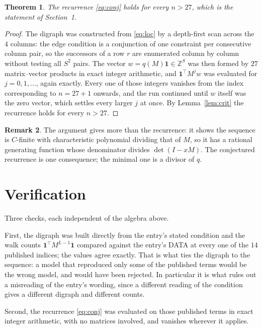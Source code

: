 \documentclass[11pt,a4paper]{article}
\theoremstyle{plain}
\newtheorem{theorem}{Theorem}
\theoremstyle{definition}
\newtheorem{remark}[theorem]{Remark}
\begin{document}
\begin{theorem}
The recurrence \eqref{eq:conj} holds for every $n>27$, which is the statement of
Section~1.
\end{theorem}

\begin{proof}
The digraph was constructed from \eqref{eq:loc} by a depth-first scan across the $4$
columns: the edge condition is a conjunction of one constraint per consecutive column
pair, so the successors of a row $r$ are enumerated column by column without testing all
$S^2$ pairs. The vector $w=q(M)\mathbf{1}\in\mathbb{Z}^{S}$ was then formed by $27$
matrix--vector products in exact integer arithmetic, and $\mathbf{1}^{\!\top}M^{j}w$ was
evaluated for $j=0,1,\dots$, again exactly. Every one of those integers vanishes from the
index corresponding to $n=27+1$ onwards, and the run continued until $w$ itself was the
zero vector, which settles every larger $j$ at once. By Lemma~\ref{lem:crit} the recurrence
holds for every $n>27$.
\end{proof}

\begin{remark}
The argument gives more than the recurrence: it shows the sequence is $C$-finite with
characteristic polynomial dividing that of $M$, so it has a rational generating function
whose denominator divides $\det(I-xM)$. The conjectured recurrence is one consequence; the
minimal one is a divisor of $q$.
\end{remark}

\section{Verification}

Three checks, each independent of the algebra above.

First, the digraph was built directly from the entry's stated condition and the walk counts
$\mathbf{1}^{\!\top}M^{L-1}\mathbf{1}$ compared against the entry's DATA at
every one of the $14$ published indices; the values agree exactly. That is what ties
the digraph to the sequence: a model that reproduced only some of the published terms would
be the wrong model, and would have been rejected. In particular it is what rules out a
misreading of the entry's wording, since a different reading of the condition gives a
different digraph and different counts.

Second, the recurrence \eqref{eq:conj} was evaluated on those published terms in exact
integer arithmetic, with no matrices involved, and vanishes wherever it applies.
\end{document}

